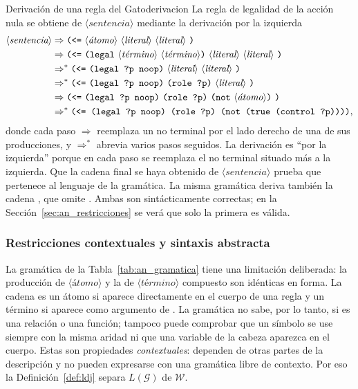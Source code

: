 \begin{ejemplo}{Derivación de una regla del Gato}{derivacion}
La regla de legalidad de la acción nula se obtiene de $\langle\textit{sentencia}\rangle$ mediante la derivación por la izquierda
\begin{align*}
\langle\textit{sentencia}\rangle
&\Rightarrow \kw{(<=}\ \langle\textit{átomo}\rangle\ \langle\textit{literal}\rangle\ \langle\textit{literal}\rangle\ \kw{)} \\
&\Rightarrow \kw{(<=}\ \kw{(legal}\ \langle\textit{término}\rangle\ \langle\textit{término}\rangle\kw{)}\ \langle\textit{literal}\rangle\ \langle\textit{literal}\rangle\ \kw{)} \\
&\Rightarrow^{*} \kw{(<=}\ \kw{(legal ?p noop)}\ \langle\textit{literal}\rangle\ \langle\textit{literal}\rangle\ \kw{)} \\
&\Rightarrow^{*} \kw{(<=}\ \kw{(legal ?p noop)}\ \kw{(role ?p)}\ \langle\textit{literal}\rangle\ \kw{)} \\
&\Rightarrow \kw{(<=}\ \kw{(legal ?p noop)}\ \kw{(role ?p)}\ \kw{(not}\ \langle\textit{átomo}\rangle\kw{)}\ \kw{)} \\
&\Rightarrow^{*} \kw{(<= (legal ?p noop) (role ?p) (not (true (control ?p))))} ,
\end{align*}
donde cada paso $\Rightarrow$ reemplaza un no terminal por el lado derecho de una de sus producciones, y $\Rightarrow^{*}$ abrevia varios pasos seguidos. La derivación es ``por la izquierda'' porque en cada paso se reemplaza el no terminal situado más a la izquierda. Que la cadena final se haya obtenido de $\langle\textit{sentencia}\rangle$ prueba que pertenece al lenguaje de la gramática. La misma gramática deriva también la cadena , que omite . Ambas son sintácticamente correctas; en la Sección~\ref{sec:an_restricciones} se verá que solo la primera es válida.
\end{ejemplo}

\subsubsection{Restricciones contextuales y sintaxis abstracta}

La gramática de la Tabla~\ref{tab:an_gramatica} tiene una limitación deliberada: la producción de $\langle\textit{átomo}\rangle$ y la de $\langle\textit{término}\rangle$ compuesto son idénticas en forma. La cadena  es un átomo si aparece directamente en el cuerpo de una regla y un término si aparece como argumento de . La gramática no sabe, por lo tanto, si  es una relación o una función; tampoco puede comprobar que un símbolo se use siempre con la misma aridad ni que una variable de la cabeza aparezca en el cuerpo. Estas son propiedades \emph{contextuales}: dependen de otras partes de la descripción y no pueden expresarse con una gramática libre de contexto. Por eso la Definición~\ref{def:ldj} separa $L(\mathcal G)$ de $\mathcal W$.

